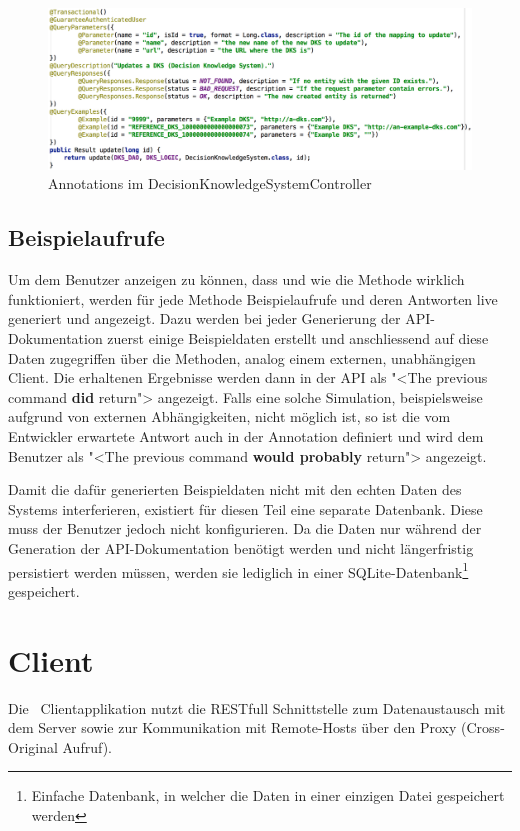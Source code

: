			\begin{figure}[H]
				\includegraphics[width=\textwidth]{interfacesAndProtocols/media/img/apiAnnotations.png}
				\centering
				\caption{Annotations im DecisionKnowledgeSystemController}
				\label{fig:apiAnnotations}
			\end{figure}
			
			
	\subsection{Beispielaufrufe}
	\label{subsubsec:exampleQueries}
		Um dem Benutzer anzeigen zu können, dass und wie die Methode wirklich funktioniert,
		werden für jede Methode Beispielaufrufe und deren Antworten live generiert und angezeigt.
		Dazu werden bei jeder Generierung der API-Dokumentation zuerst einige Beispieldaten erstellt
		und anschliessend auf diese Daten zugegriffen über die Methoden, analog einem externen, unabhängigen Client.
		Die erhaltenen Ergebnisse werden dann in der API als "<The previous command \textbf{did} return"> angezeigt.
		Falls eine solche Simulation, beispielsweise aufgrund von externen Abhängigkeiten, nicht möglich ist,
		so ist die vom Entwickler erwartete Antwort auch in der Annotation definiert und wird dem Benutzer als
		"<The previous command \textbf{would probably} return"> angezeigt.
		
		Damit die dafür generierten Beispieldaten nicht mit den echten Daten des Systems interferieren,
		existiert für diesen Teil eine separate Datenbank.
		Diese muss der Benutzer jedoch nicht konfigurieren.
		Da die Daten nur während der Generation der API-Dokumentation benötigt werden
		und nicht längerfristig persistiert werden müssen,
		werden sie lediglich in einer SQLite-Datenbank\footnote{Einfache Datenbank, in welcher die Daten in einer einzigen Datei gespeichert werden} gespeichert.
	


\section{Client}
		Die \eeppi\ Clientapplikation nutzt die RESTfull Schnittstelle zum Datenaustausch mit dem Server sowie zur Kommunikation mit Remote-Hosts über den Proxy (Cross-Original Aufruf).
		
